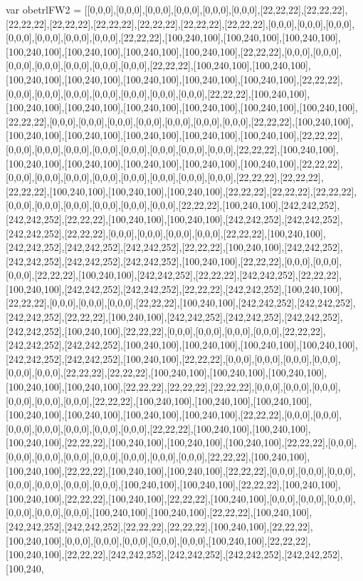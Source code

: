 var obetrlFW2 = [[0,0,0],[0,0,0],[0,0,0],[0,0,0],[0,0,0],[0,0,0],[22,22,22],[22,22,22],[22,22,22],[22,22,22],[22,22,22],[22,22,22],[22,22,22],[22,22,22],[0,0,0],[0,0,0],[0,0,0],[0,0,0],[0,0,0],[0,0,0],[0,0,0],[22,22,22],[100,240,100],[100,240,100],[100,240,100],[100,240,100],[100,240,100],[100,240,100],[100,240,100],[22,22,22],[0,0,0],[0,0,0],[0,0,0],[0,0,0],[0,0,0],[0,0,0],[0,0,0],[22,22,22],[100,240,100],[100,240,100],[100,240,100],[100,240,100],[100,240,100],[100,240,100],[100,240,100],[22,22,22],[0,0,0],[0,0,0],[0,0,0],[0,0,0],[0,0,0],[0,0,0],[0,0,0],[22,22,22],[100,240,100],[100,240,100],[100,240,100],[100,240,100],[100,240,100],[100,240,100],[100,240,100],[22,22,22],[0,0,0],[0,0,0],[0,0,0],[0,0,0],[0,0,0],[0,0,0],[0,0,0],[22,22,22],[100,240,100],[100,240,100],[100,240,100],[100,240,100],[100,240,100],[100,240,100],[22,22,22],[0,0,0],[0,0,0],[0,0,0],[0,0,0],[0,0,0],[0,0,0],[0,0,0],[0,0,0],[22,22,22],[100,240,100],[100,240,100],[100,240,100],[100,240,100],[100,240,100],[100,240,100],[22,22,22],[0,0,0],[0,0,0],[0,0,0],[0,0,0],[0,0,0],[0,0,0],[0,0,0],[0,0,0],[22,22,22],[22,22,22],[22,22,22],[100,240,100],[100,240,100],[100,240,100],[22,22,22],[22,22,22],[22,22,22],[0,0,0],[0,0,0],[0,0,0],[0,0,0],[0,0,0],[0,0,0],[22,22,22],[100,240,100],[242,242,252],[242,242,252],[22,22,22],[100,240,100],[100,240,100],[242,242,252],[242,242,252],[242,242,252],[22,22,22],[0,0,0],[0,0,0],[0,0,0],[0,0,0],[22,22,22],[100,240,100],[242,242,252],[242,242,252],[242,242,252],[22,22,22],[100,240,100],[242,242,252],[242,242,252],[242,242,252],[242,242,252],[100,240,100],[22,22,22],[0,0,0],[0,0,0],[0,0,0],[22,22,22],[100,240,100],[242,242,252],[22,22,22],[242,242,252],[22,22,22],[100,240,100],[242,242,252],[242,242,252],[22,22,22],[242,242,252],[100,240,100],[22,22,22],[0,0,0],[0,0,0],[0,0,0],[22,22,22],[100,240,100],[242,242,252],[242,242,252],[242,242,252],[22,22,22],[100,240,100],[242,242,252],[242,242,252],[242,242,252],[242,242,252],[100,240,100],[22,22,22],[0,0,0],[0,0,0],[0,0,0],[0,0,0],[22,22,22],[242,242,252],[242,242,252],[100,240,100],[100,240,100],[100,240,100],[100,240,100],[242,242,252],[242,242,252],[100,240,100],[22,22,22],[0,0,0],[0,0,0],[0,0,0],[0,0,0],[0,0,0],[0,0,0],[22,22,22],[22,22,22],[100,240,100],[100,240,100],[100,240,100],[100,240,100],[100,240,100],[22,22,22],[22,22,22],[22,22,22],[0,0,0],[0,0,0],[0,0,0],[0,0,0],[0,0,0],[0,0,0],[22,22,22],[100,240,100],[100,240,100],[100,240,100],[100,240,100],[100,240,100],[100,240,100],[100,240,100],[22,22,22],[0,0,0],[0,0,0],[0,0,0],[0,0,0],[0,0,0],[0,0,0],[0,0,0],[22,22,22],[100,240,100],[100,240,100],[100,240,100],[22,22,22],[100,240,100],[100,240,100],[100,240,100],[22,22,22],[0,0,0],[0,0,0],[0,0,0],[0,0,0],[0,0,0],[0,0,0],[0,0,0],[0,0,0],[22,22,22],[100,240,100],[100,240,100],[22,22,22],[100,240,100],[100,240,100],[22,22,22],[0,0,0],[0,0,0],[0,0,0],[0,0,0],[0,0,0],[0,0,0],[0,0,0],[100,240,100],[100,240,100],[22,22,22],[100,240,100],[100,240,100],[22,22,22],[100,240,100],[22,22,22],[100,240,100],[0,0,0],[0,0,0],[0,0,0],[0,0,0],[0,0,0],[0,0,0],[100,240,100],[100,240,100],[22,22,22],[100,240,100],[242,242,252],[242,242,252],[22,22,22],[22,22,22],[100,240,100],[22,22,22],[100,240,100],[0,0,0],[0,0,0],[0,0,0],[0,0,0],[0,0,0],[100,240,100],[22,22,22],[100,240,100],[22,22,22],[242,242,252],[242,242,252],[242,242,252],[242,242,252],[100,240,